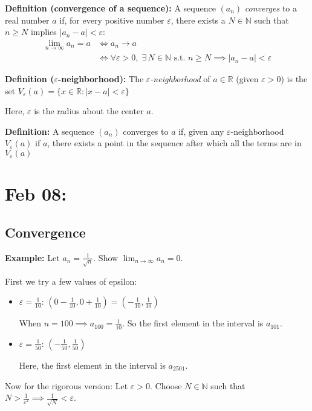\documentclass[12pt]{report}
\newcommand{\R}{\mathbb{R}}
\newcommand{\N}{\mathbb{N}}
\newcommand{\abs}[1]{\left\vert #1 \right\vert}
\newcommand{\st}{\text{ s.t. }}
\begin{document}
        \textbf{Definition (convergence of a sequence):} A sequence $(a_n)$ \emph{converges} to a real number $a$ if, for every positive number $\varepsilon$, there exists a $N \in \N$ such that $n \geq N$ implies $\abs{a_n - a} < \varepsilon$:
        \begin{align*}
            \lim_{n\to \infty} a_n = a &\iff a_n \to a \\ 
                &\iff \forall \varepsilon > 0, \; \exists\, N \in \N \st n \geq N \implies \abs{a_n - a} < \varepsilon
        \end{align*}

        \textbf{Definition ($\varepsilon$-neighborhood):} The \emph{$\varepsilon$-neighborhood} of $a \in \R$ (given $\varepsilon > 0$) is the set $V_{\varepsilon}(a) = \{x \in \R: \abs{x - a} < \varepsilon\}$

        Here, $\varepsilon$ is the radius about the center $a$. 

        \textbf{Definition:} A sequence $(a_n)$ converges to $a$ if, given any $\varepsilon$-neighborhood $V_{\varepsilon}(a)$ if $a$, there exists a point in the sequence after which all the terms are in $V_{\varepsilon}(a)$

\section{Feb 08:}
    \subsection*{Convergence}
        \textbf{Example:} Let $a_n = \frac{1}{\sqrt n}$. Show $\lim_{n\to \infty} a_n = 0$. 

        First we try a few values of epsilon:
        \begin{itemize}
            \item $\varepsilon = \frac{1}{10}$: $(0 - \frac{1}{10}, 0 + \frac{1}{10}) = (-\frac{1}{10}, \frac{1}{10})$
            
            When $n = 100 \implies a_{100} = \frac{1}{10}$. So the first element in the interval is $a_{101}$. 

            \item $\varepsilon = \frac{1}{50}$: $(-\frac{1}{50}, \frac{1}{50})$ 
            
            Here, the first element in the interval is $a_{2501}$.
        \end{itemize}

        Now for the rigorous version: Let $\varepsilon > 0$. Choose $N \in \N$ such that $N > \frac{1}{\varepsilon^2} \implies \frac{1}{\sqrt{N}} < \varepsilon$. 
\end{document}
